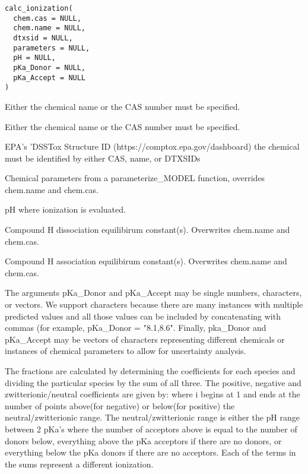 \documentclass[a4paper]{book}
\begin{document}
%
\begin{Usage}
\begin{verbatim}
calc_ionization(
  chem.cas = NULL,
  chem.name = NULL,
  dtxsid = NULL,
  parameters = NULL,
  pH = NULL,
  pKa_Donor = NULL,
  pKa_Accept = NULL
)
\end{verbatim}
\end{Usage}
%
\begin{Arguments}
\begin{ldescription}
\item[\code{chem.cas}] Either the chemical name or the CAS number must be
specified.

\item[\code{chem.name}] Either the chemical name or the CAS number must be
specified.

\item[\code{dtxsid}] EPA's 'DSSTox Structure ID (https://comptox.epa.gov/dashboard)
the chemical must be identified by either CAS, name, or DTXSIDs

\item[\code{parameters}] Chemical parameters from a parameterize\_MODEL function,
overrides chem.name and chem.cas.

\item[\code{pH}] pH where ionization is evaluated.

\item[\code{pKa\_Donor}] Compound H dissociation equilibirum constant(s).
Overwrites chem.name and chem.cas.

\item[\code{pKa\_Accept}] Compound H association equilibirum constant(s).
Overwrites chem.name and chem.cas.
\end{ldescription}
\end{Arguments}
%
\begin{Details}\relax
The arguments pKa\_Donor and pKa\_Accept may be single numbers, characters, or 
vectors. We support characters because there are many instances with multiple 
predicted values and all those values can be included by concatenating with 
commas (for example, pKa\_Donor = "8.1,8.6". Finally, pka\_Donor and pKa\_Accept 
may be vectors of characters representing different chemicals or instances of
chemical parameters to allow for uncertainty analysis.

The fractions are calculated by determining the coefficients for each
species and dividing the particular species by the sum of all three.  The
positive, negative and zwitterionic/neutral coefficients are given by:
   where i begins at 1 and ends at
the number of points above(for negative) or below(for positive) the
neutral/zwitterionic range.  The neutral/zwitterionic range is either the pH
range between 2 pKa's where the number of acceptors above is equal to the
number of donors below, everything above the pKa acceptors if there are no
donors, or everything below the pKa donors if there are no acceptors.  Each
of the terms in the sums represent a different ionization.
\end{Details}
\end{document}
